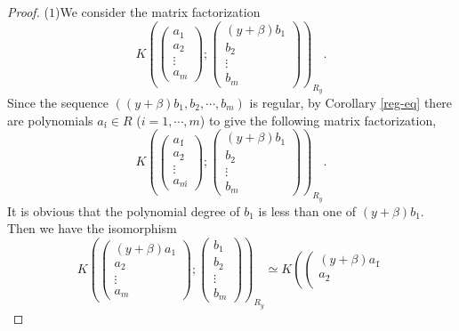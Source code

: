 \documentclass[10pt]{amsart}
\theoremstyle{break}
\begin{document}
\begin{proof}
($1$)We consider the matrix factorization
\begin{equation*}
K\left(\left(
\begin{array}{c}
a_1\\
a_2\\
\vdots\\
a_m
\end{array}
\right);
\left(
\begin{array}{c}
(y+\beta)b_1\\
b_2\\
\vdots\\
b_m
\end{array}
\right)\right)_{R_y}.
\end{equation*}
Since the sequence $((y+\beta)b_1,b_2,\cdots,b_m)$ is regular, by Corollary \ref{reg-eq} there are polynomials $a_i\acute{} \in R$ ($i=1,\cdots ,m$) to give the following matrix factorization,
\begin{equation*}
K\left(\left(
\begin{array}{c}
a_1\acute{}\\
a_2\acute{}\\
\vdots\\
a_m\acute{}
\end{array}
\right);
\left(
\begin{array}{c}
(y+\beta)b_1\\
b_2\\
\vdots\\
b_m
\end{array}
\right)\right)_{R_y}.
\end{equation*}
It is obvious that the polynomial degree of $b_1$ is less than one of $(y+\beta)b_1$. Then we have the isomorphism
\begin{equation*}
K\left(\left(
\begin{array}{c}
(y+\beta)a_1\\
a_2\\
\vdots\\
a_m
\end{array}
\right);
\left(
\begin{array}{c}
b_1\\
b_2\\
\vdots\\
b_m
\end{array}
\right)\right)_{R_y}
\simeq
K\left(\left(
\begin{array}{c}
(y+\beta)a_1\acute{}\\
a_2\acute{}\\

\end{array}
\end{equation*}
\end{proof}
\end{document}
